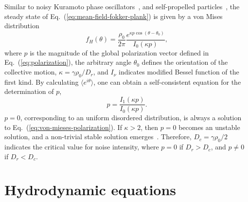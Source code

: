 \documentclass[reprint,floatfix,amsmath,amssymb,aps,pre,showkeys,showpacs,superscriptaddress]{revtex4-1}
\newcommand{\ave}[1]{\langle #1 \rangle}
\newcommand{\p}{p}
\newcommand{\hl}[1]{\textcolor{hlcolor}{#1}}
\newcommand{\req}[1]{Eq.~(\ref{#1})}
\begin{document}
Similar to noisy Kuramoto phase oscillators~\cite{Shinomoto1986phase,Sakaguchi1988phase}, and self-propelled particles~\cite{peruani2008mean,Grossmann2013}, the steady state of \req{eq:mean-field-fokker-plank} is given by a von Mises distribution
\begin{equation}
f_H(\theta) = \frac{\rho_0}{2 \pi} \frac{e^{\kappa \p \cos(\theta - \theta_0)}}{I_0(\kappa \p)},
\label{eq:von-mieses}
\end{equation}
where $\p$ is the magnitude of the global polarization vector \hl{defined in \req{eq:polarization}}, \hl{the arbitrary angle $\theta_0$ defines the orientation of the collective motion,} $\kappa=\gamma \rho_0 / D_r$, and $I_{\nu}$ indicates modified Bessel function of the first kind. By calculating $\ave{e^{i \theta}}$, one can obtain a self-consistent equation for the determination of $p$,
\begin{equation}
\p = \frac{I_1(\kappa \p)}{I_0(\kappa \p)}.
\label{eq:von-mieses-polarization}
\end{equation}
$\p = 0$, corresponding to an uniform disordered distribution, is always a solution to \req{eq:von-mieses-polarization}. If $\kappa > 2$, then $\p=0$ becomes an unstable solution, and a non-trivial stable solution emerges~\cite{Shinomoto1986phase,Sakaguchi1988phase}. Therefore\hl{,} $D_c = \gamma \rho_0 / 2$ indicates the critical value for noise intensity, where $\p=0$ if $D_r > D_c$, and $\p \neq 0$ if $D_r < D_c$.

\section{Hydrodynamic equations}
\label{section:hydrodynamics}
\end{document}
